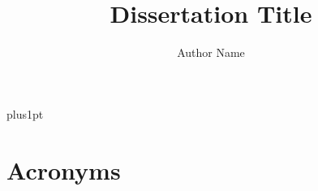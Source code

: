 \documentclass[12pt]{dissertation}
\title{Dissertation Title}
\author{Author Name}             %
\begin{document}
\baselineskip=18pt plus1pt

\setcounter{secnumdepth}{3}
\setcounter{tocdepth}{3}


\maketitle                  %

\begin{romanpages}          %
\tableofcontents            %
\listoffigures              %
\begingroup
\let\clearpage\relax
\bigskip
\listoftables
\endgroup
\end{romanpages}            %

\setlength{\parskip}{1em}






\section*{Acronyms}
\begin{acronym}

\end{acronym}

%


\end{document}
